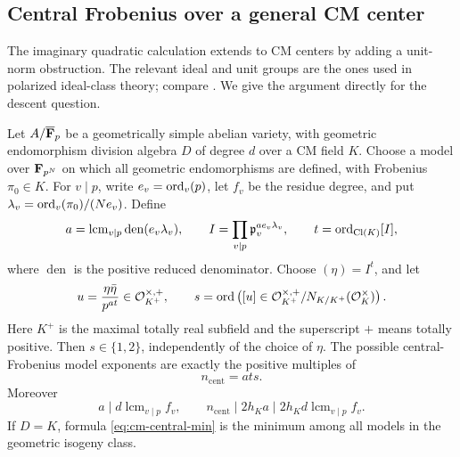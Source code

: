\subsection{Central Frobenius over a general CM center}

The imaginary quadratic calculation extends to CM centers by adding
a unit-norm obstruction. The relevant ideal and unit groups are the
ones used in polarized ideal-class theory; compare
\citet[Lemma 5.5 and \S5.3]{BrooksEtAl2017}. We give the argument
directly for the descent question.

\begin{proposition}\label{prop:central-cm}
Let $A/\overline{\mathbf F}_p$ be a geometrically simple abelian variety, with geometric
endomorphism division algebra $D$ of degree $d$ over a CM field
$K$. Choose a model over $\mathbf F_{p^N}$ on which all geometric
endomorphisms are defined, with Frobenius $\pi_0\in K$. For
$v\mid p$, write $e_v=\operatorname{ord}_v(p)$, let $f_v$ be the residue degree,
and put $\lambda_v=\operatorname{ord}_v(\pi_0)/(Ne_v)$. Define
\[
 a=\operatorname{lcm}_{v\mid p}\operatorname{den}(e_v\lambda_v),
 \qquad
 I=\prod_{v\mid p}\mathfrak p_v^{a e_v\lambda_v},
 \qquad t=\operatorname{ord}_{\operatorname{Cl}(K)}[I],
\]
where $\operatorname{den}$ is the positive reduced denominator.
Choose $(\eta)=I^t$, and let
\[
 u=\frac{\eta\bar\eta}{p^{at}}\in\mathcal O_{K^+}^{\times,+},
 \qquad
 s=\operatorname{ord}\left([u]\in
 \mathcal O_{K^+}^{\times,+}/N_{K/K^+}(\mathcal O_K^\times)\right).
\]
Here $K^+$ is the maximal totally real subfield and the superscript
$+$ means totally positive. Then $s\in\{1,2\}$, independently
of the choice of $\eta$. The possible central-Frobenius model
exponents are exactly the positive multiples of
\begin{equation}\label{eq:cm-central-min}
                         n_{\mathrm{cent}}=ats.
\end{equation}
Moreover
\[
 a\mid d\operatorname{lcm}_{v\mid p}f_v,
 \qquad n_{\mathrm{cent}}\mid 2h_Ka
               \mid 2h_Kd\operatorname{lcm}_{v\mid p}f_v.
\]
If $D=K$, formula \eqref{eq:cm-central-min} is the minimum among
all models in the geometric isogeny class.
\end{proposition}

